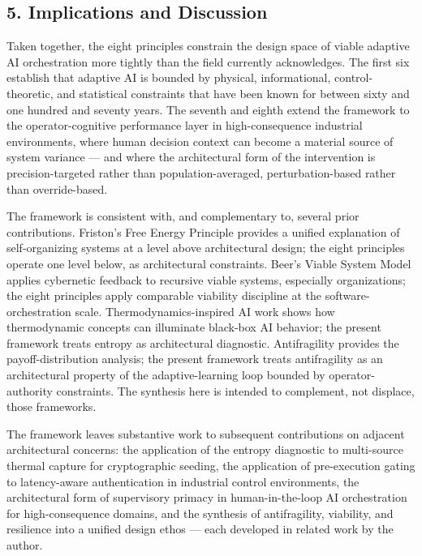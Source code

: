 \subsection{5. Implications and
Discussion}\label{implications-and-discussion}

Taken together, the eight principles constrain the design space of
viable adaptive AI orchestration more tightly than the field currently
acknowledges. The first six establish that adaptive AI is bounded by
physical, informational, control-theoretic, and statistical constraints
that have been known for between sixty and one hundred and seventy
years. The seventh and eighth extend the framework to the
operator-cognitive performance layer in high-consequence industrial
environments, where human decision context can become a material source
of system variance --- and where the architectural form of the
intervention is precision-targeted rather than population-averaged,
perturbation-based rather than override-based.

The framework is consistent with, and complementary to, several prior
contributions. Friston's Free Energy Principle \cite{ref3} provides a
unified explanation of self-organizing systems at a level above
architectural design; the eight principles operate one level below, as
architectural constraints. Beer's Viable System Model \cite{ref4} applies
cybernetic feedback to recursive viable systems, especially
organizations; the eight principles apply comparable viability
discipline at the software-orchestration scale. Thermodynamics-inspired
AI work \cite{ref5} shows how thermodynamic concepts can illuminate
black-box AI behavior; the present framework treats entropy as
architectural diagnostic. Antifragility \cite{ref10} provides the
payoff-distribution analysis; the present framework treats antifragility
as an architectural property of the adaptive-learning loop bounded by
operator-authority constraints. The synthesis here is intended to
complement, not displace, those frameworks.

The framework leaves substantive work to subsequent contributions on
adjacent architectural concerns: the application of the entropy
diagnostic to multi-source thermal capture for cryptographic seeding,
the application of pre-execution gating to latency-aware authentication
in industrial control environments, the architectural form of
supervisory primacy in human-in-the-loop AI orchestration for
high-consequence domains, and the synthesis of antifragility, viability,
and resilience into a unified design ethos --- each developed in related
work by the author.

